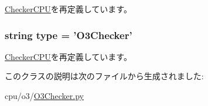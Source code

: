 \hyperlink{classCheckerCPU_1_1CheckerCPU_a17da7064bc5c518791f0c891eff05fda}{CheckerCPU}を再定義しています。\hypertarget{classO3Checker_1_1O3Checker_acce15679d830831b0bbe8ebc2a60b2ca}{
\subsubsection[{type}]{\setlength{\rightskip}{0pt plus 5cm}string {\bf type} = '{\bf O3Checker}'}}
\label{classO3Checker_1_1O3Checker_acce15679d830831b0bbe8ebc2a60b2ca}


\hyperlink{classCheckerCPU_1_1CheckerCPU_acce15679d830831b0bbe8ebc2a60b2ca}{CheckerCPU}を再定義しています。

このクラスの説明は次のファイルから生成されました:\begin{DoxyCompactItemize}
\item 
cpu/o3/\hyperlink{O3Checker_8py}{O3Checker.py}\end{DoxyCompactItemize}
